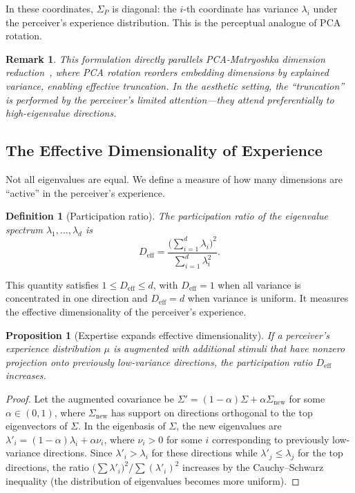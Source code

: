 \documentclass[journal]{IEEEtran}
\newtheorem{proposition}[theorem]{Proposition}
\newtheorem{definition}[theorem]{Definition}
\newtheorem{remark}[theorem]{Remark}
\begin{document}
In these coordinates, $\Sigma_P$ is diagonal: the $i$-th coordinate
has variance $\lambda_i$ under the perceiver's experience distribution.
This is the perceptual analogue of PCA rotation.

\begin{remark}
This formulation directly parallels PCA-Matryoshka dimension
reduction~\cite{bond2026pcamatryoshka}, where PCA rotation reorders
embedding dimensions by explained variance, enabling effective
truncation.  In the aesthetic setting, the ``truncation'' is performed
by the perceiver's limited attention---they attend preferentially to
high-eigenvalue directions.
\end{remark}


\subsection{The Effective Dimensionality of Experience}

Not all eigenvalues are equal.  We define a measure of how many
dimensions are ``active'' in the perceiver's experience.

\begin{definition}[Participation ratio]
\label{def:pr}
The \emph{participation ratio} of the eigenvalue spectrum
$\lambda_1, \ldots, \lambda_d$ is
\begin{equation}
    D_{\mathrm{eff}} = \frac{\bigl(\sum_{i=1}^d \lambda_i\bigr)^2}
    {\sum_{i=1}^d \lambda_i^2}.
    \label{eq:pr}
\end{equation}
\end{definition}

This quantity satisfies $1 \leq D_{\mathrm{eff}} \leq d$, with
$D_{\mathrm{eff}} = 1$ when all variance is concentrated in one
direction and $D_{\mathrm{eff}} = d$ when variance is uniform.  It
measures the effective dimensionality of the perceiver's experience.

\begin{proposition}[Expertise expands effective dimensionality]
\label{prop:expertise}
If a perceiver's experience distribution $\mu$ is augmented with
additional stimuli that have nonzero projection onto previously
low-variance directions, the participation ratio $D_{\mathrm{eff}}$
increases.
\end{proposition}

\begin{proof}
Let the augmented covariance be $\Sigma' = (1-\alpha)\Sigma +
\alpha \Sigma_{\mathrm{new}}$ for some $\alpha \in (0,1)$, where
$\Sigma_{\mathrm{new}}$ has support on directions orthogonal to the
top eigenvectors of $\Sigma$.  In the eigenbasis of $\Sigma$, the
new eigenvalues are $\lambda'_i = (1-\alpha)\lambda_i +
\alpha \nu_i$, where $\nu_i > 0$ for some $i$ corresponding to
previously low-variance directions.  Since $\lambda'_i > \lambda_i$
for these directions while $\lambda'_j \leq \lambda_j$ for the
top directions, the ratio
$\bigl(\sum \lambda'_i\bigr)^2 / \sum (\lambda'_i)^2$ increases
by the Cauchy--Schwarz inequality (the distribution of eigenvalues
becomes more uniform).
\end{proof}
\end{document}
